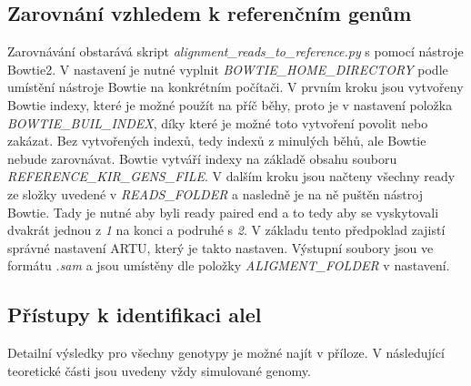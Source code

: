 \documentclass[czech,DP]{thesiskiv}
\numberwithin{equation}{section}
\begin{document}
\subsection{Zarovnání vzhledem k referenčním genům}
Zarovnávání obstarává skript \textit{alignment\_reads\_to\_reference.py} s pomocí nástroje Bowtie2. V nastavení je nutné vyplnit \textit{BOWTIE\_HOME\_DIRECTORY} podle umístění nástroje Bowtie na konkrétním počítači. V prvním kroku jsou vytvořeny Bowtie indexy, které je možné použít na příč běhy, proto je v nastavení položka \textit{BOWTIE\_BUIL\_INDEX}, díky které je možné toto vytvoření povolit nebo zakázat. Bez vytvořených indexů, tedy indexů z minulých běhů, ale Bowtie nebude zarovnávat. Bowtie vytváří indexy na základě obsahu souboru \textit{REFERENCE\_KIR\_GENS\_FILE}. V dalším kroku jsou načteny všechny ready ze složky uvedené v \textit{READS\_FOLDER} a nasledně je na ně puštěn nástroj Bowtie. Tady je nutné aby byli ready paired end a to tedy aby se vyskytovali dvakrát jednou z \textit{1} na konci a podruhé s \textit{2}. V základu tento předpoklad zajistí správné nastavení ARTU, který je takto nastaven. Výstupní soubory jsou ve formátu \textit{.sam} a jsou umístěny dle položky \textit{ALIGMENT\_FOLDER} v nastavení. 

\subsection{Přístupy k identifikaci alel}
Detailní výsledky pro všechny genotypy je možné najít v příloze. V následující teoretické části jsou uvedeny vždy simulované genomy.
\end{document}

